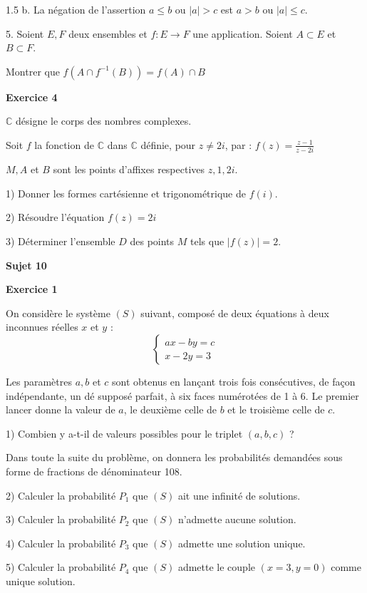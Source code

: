 \documentclass[12pt]{article}
\begin{document}
\begin{spacing}{1.5}
b. La négation de l'assertion  $a\leq b$ ou $\mid a\mid> c$ est $a>b$ ou $\mid a\mid\leq c$.

5. Soient $E,F$ deux ensembles et $f:E\longrightarrow F$ une application. Soient $A\subset E$ et $B\subset F$.

Montrer que $f(A\cap f^{-1}(B))=f(A)\cap B$

\medskip\textbf{Exercice 4}

$\mathbb{C}$ désigne le corps des nombres complexes. 

Soit $f$ la fonction de $\mathbb{C}$ dans $\mathbb{C}$ définie, pour $z\neq 2i$, par : 
$f(z) = \frac{z -1}{z -2i}$

$M, A $ et $ B$ sont les points d'affixes respectives $z, 1, 2i$. 

1) Donner les formes cartésienne et trigonométrique de $f(i)$. 

2) Résoudre l'équation $f(z) = 2i$ 

3) Déterminer l'ensemble $D$ des points $M$ tels que $\mid f(z) \mid = 2$.

\quad
\quad
\medskip\textbf{Sujet 10}

\textbf{Exercice 1}

On considère le système $(S)$ suivant, composé de deux équations à deux inconnues 
réelles $x$ et $y$ :
\medskip
\[\begin{cases}
ax-by=c\\
x-2y=3
\end{cases}\]

 Les paramètres $a, b$ et $c$ sont obtenus en lançant trois fois consécutives, de façon indépendante, un dé supposé parfait, à six faces numérotées de 1 à 6. Le premier lancer donne la valeur de $a$, le deuxième celle de $b$ et le troisième celle de $c$. 

1) Combien y a-t-il de valeurs possibles pour le triplet $(a, b, c)$ ? 

Dans toute la suite du problème, on donnera les probabilités demandées sous 
forme de fractions de dénominateur 108. 

2) Calculer la probabilité $P_1$ que $(S)$ ait une infinité de solutions. 

3) Calculer la probabilité $P_2$ que $(S)$ n'admette aucune solution. 

4) Calculer la probabilité $P_3$ que $(S)$ admette une solution unique. 

5) Calculer la probabilité $P_4$ que $(S)$ admette le couple $(x = 3, y = 0)$ comme unique 
solution. 


\end{spacing}
\end{document}

